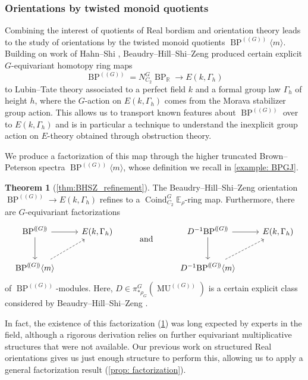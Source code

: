 \documentclass[a4paper, 10pt]{article}
\newcommand{\E}{\mathbb E}  %
\newcommand{\MU}{\operatorname{MU}}
\newcommand{\MUG}{{\MU^{(\!(G)\!)}}}
\newcommand{\BPG}{{\BP^{(\!(G)\!)}}}
\newcommand{\BPGm}{{\BP^{(\!(G)\!)}}\langle m\rangle}
\newcommand{\BP}{\operatorname{BP}}
\newcommand{\BPR}{{\BP_{\mathbb{R}}}}
\newcommand{\Coind}{\operatorname{Coind}}
\theoremstyle{definition}
\newtheorem{mainthm}{Theorem}
\begin{document}
\subsubsection*{Orientations by twisted monoid quotients}
Combining the interest of quotients of Real bordism and orientation theory leads to the study of orientations by the twisted monoid quotients $\BPGm$. Building on work of Hahn--Shi \cite{hahnRealOrientationsLubin2020}, Beaudry--Hill--Shi--Zeng \cite{beaudryHillShiZeng2021modelsLubinTate} produced certain explicit $G$-equivariant homotopy ring maps
\[ \BPG = N_{C_2}^G \BPR \longrightarrow E(k, \Gamma_h) \]
to Lubin--Tate theory associated to a perfect field $k$ and a formal group law $\Gamma_h$ of height $h$, where the $G$-action on $E(k, \Gamma_h)$ comes from the Morava stabilizer group action. This allows us to transport known features about $\BPG$ over to $E(k,\Gamma_h)$ and is in particular a technique to understand the inexplicit group action on $E$-theory obtained through obstruction theory.

We produce a factorization of this map through the higher truncated Brown--Peterson spectra $\BPGm$, whose definition we recall in \cref{example: BPGJ}.

\begin{mainthm}[\cref{thm:BHSZ_refinement}] \label{mainthm: BHSZ}
    The Beaudry--Hill--Shi--Zeng orientation \(\BPG \to E(k,\Gamma_h)\) refines to a \(\Coind^G_{C_2}\E_\rho\)-ring map.
    Furthermore, there are \(G\)-equivariant factorizations
    \[
    \begin{tikzcd}
        \BPG \ar[r]\ar[d] & E(k,\Gamma_h)
        &
        \raisebox{-0.9em}{\text{and}}
        &
        D^{-1}\BPG \ar[r]\ar[d] & E(k,\Gamma_h) \\
        \BPGm \ar[ru, dashed]
        &&
        &
        D^{-1}\BPGm \ar[ru, dashed]
    \end{tikzcd}
    \]
    of $\BPG$-modules. Here, \(D\in \pi^{G}_{*\rho_G} \left(\MUG \right)\) is a certain explicit class considered by Beaudry--Hill--Shi--Zeng \cite[Section 6]{beaudryHillShiZeng2021modelsLubinTate}.
\end{mainthm}

In fact, the existence of this factorization (\cref{mainthm: BHSZ}) was long expected by experts in the field, although a rigorous derivation relies on further equivariant multiplicative structures that were not available. Our previous work on structured Real orientations \cite{quinnZhu2026multiplicativeequivariantthomspectra} gives us just enough structure to perform this, allowing us to apply a general factorization result (\cref{prop: factorization}).
\end{document}
